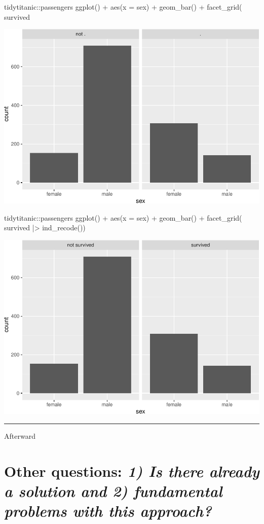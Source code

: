 \begin{Schunk}
\begin{Sinput}
tidytitanic::passengers %
ggplot() + 
  aes(x = sex) + 
  geom_bar() + 
  facet_grid(~ survived %
\end{Sinput}

\includegraphics[width=0.69\linewidth]{r_journal_files/figure-latex/unnamed-chunk-18-1} \begin{Sinput}
tidytitanic::passengers %
ggplot() + 
  aes(x = sex) + 
  geom_bar() + 
  facet_grid(~ survived |> ind_recode())
\end{Sinput}

\includegraphics[width=0.69\linewidth]{r_journal_files/figure-latex/unnamed-chunk-18-2} \end{Schunk}

\begin{center}\rule{0.5\linewidth}{0.5pt}\end{center}

Afterward

\hypertarget{other-questions-1-is-there-already-a-solution-and-2-fundamental-problems-with-this-approach}{%
\section{\texorpdfstring{Other questions: \emph{1) Is there already a
solution and 2) fundamental problems with this
approach?}}{Other questions: 1) Is there already a solution and 2) fundamental problems with this approach?}}\label{other-questions-1-is-there-already-a-solution-and-2-fundamental-problems-with-this-approach}}

